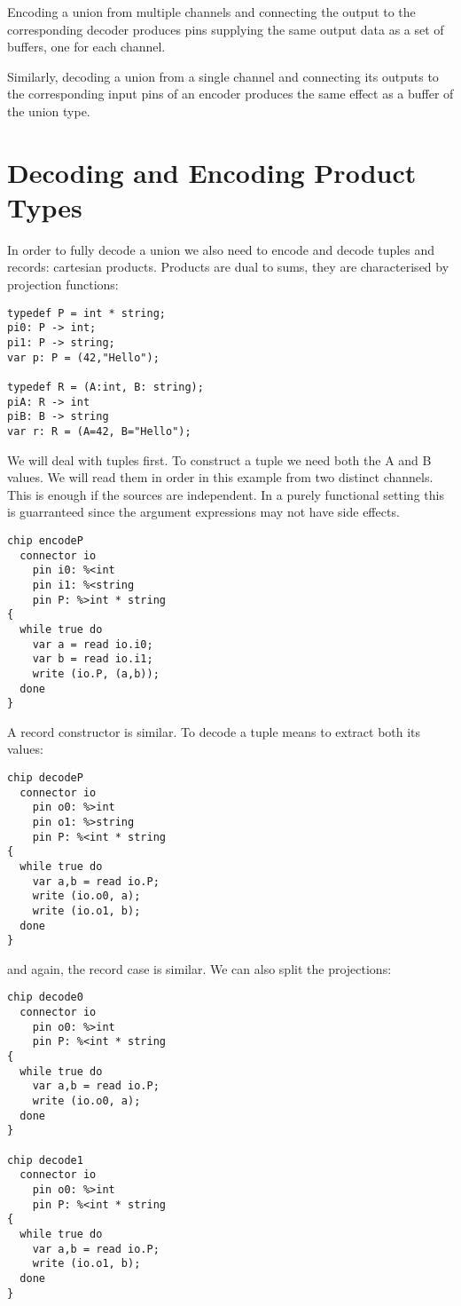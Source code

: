 \documentclass[oneside]{book}
\begin{document}
Encoding a union from multiple channels and connecting the
output to the corresponding decoder produces pins supplying
the same output data as a set of buffers, one for each channel.

Similarly, decoding a union from a single channel and connecting
its outputs to the corresponding input pins of an encoder
produces the same effect as a buffer of the union type.

\section{Decoding and Encoding Product Types}
In order to fully decode a union we also need to encode
and decode tuples and records: cartesian products.
Products are dual to sums, they are characterised by 
projection functions:

\begin{verbatim}
typedef P = int * string;
pi0: P -> int;
pi1: P -> string;
var p: P = (42,"Hello");

typedef R = (A:int, B: string);
piA: R -> int
piB: B -> string
var r: R = (A=42, B="Hello");
\end{verbatim}

We will deal with tuples first. To construct a tuple we need both
the A and B values. We will read them in order in this example
from two distinct channels. This is enough if the sources
are independent. In a purely functional setting this is guarranteed
since the argument expressions may not have side effects.

\begin{verbatim}
chip encodeP 
  connector io
    pin i0: %<int
    pin i1: %<string
    pin P: %>int * string
{
  while true do 
    var a = read io.i0;
    var b = read io.i1;
    write (io.P, (a,b));
  done
}
\end{verbatim}

A record constructor is similar. To decode a tuple means to extract
both its values:

\begin{verbatim}
chip decodeP 
  connector io
    pin o0: %>int
    pin o1: %>string
    pin P: %<int * string
{
  while true do 
    var a,b = read io.P;
    write (io.o0, a);
    write (io.o1, b);
  done
}
\end{verbatim}

and again, the record case is similar. We can also split the projections:

\begin{verbatim}
chip decode0
  connector io
    pin o0: %>int
    pin P: %<int * string
{
  while true do 
    var a,b = read io.P;
    write (io.o0, a);
  done
}

chip decode1
  connector io
    pin o0: %>int
    pin P: %<int * string
{
  while true do 
    var a,b = read io.P;
    write (io.o1, b);
  done
}
\end{verbatim}
\end{document}
